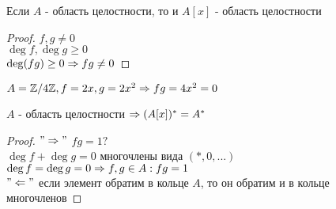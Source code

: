 \begin{conseq}
	Если $A$ - область целостности, то и $A[x]$ - область целостности
\end{conseq}

\begin{proof}
	$f, g \neq 0$\\
	$\deg f, \deg g \geq 0$\\
	$\deg (fg) \geq 0 \Rightarrow fg \neq 0$
\end{proof}
	 
\begin{Rem}
	$A = \mathbb{Z} / 4 \mathbb{Z}, f = 2x, g = 2x^2 \Rightarrow fg = 4x^2 = 0$ 
\end{Rem}	 
	 
\begin{conseq}
	$A$ - область целостности $\Rightarrow (A[x])^* = A^*$ 
\end{conseq}	 
	 
\begin{proof}
	$"\Rightarrow"$
		$fg = 1 ?$\\
		$\deg f + \deg g = 0$ многочлены вида $(*, 0, ...)$\\
		$\deg f = \deg g = 0 \Rightarrow f, g \in A: fg = 1$\\
	$"\Leftarrow"$
		если элемент обратим в кольце $A$, то он обратим и в кольце многочленов
\end{proof}
